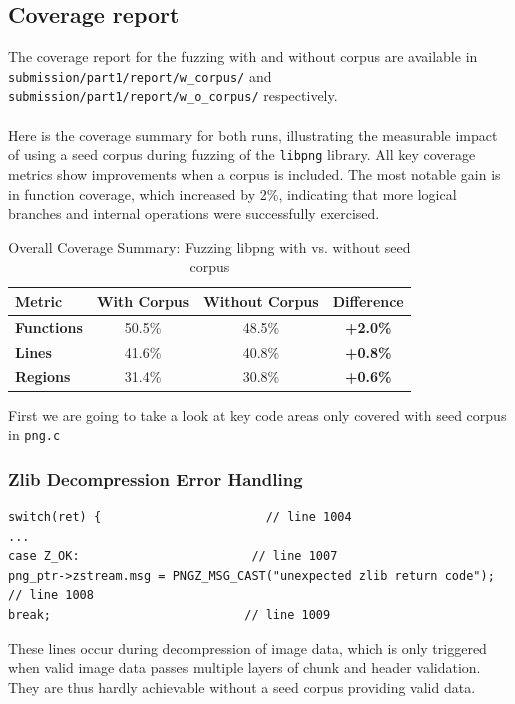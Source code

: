 \documentclass[11pt]{article}
\begin{document}
    \subsection{Coverage report}
    The coverage report for the fuzzing with and without corpus are available in \texttt{submission/part1/report/w\_corpus/} and \texttt{submission/part1/report/w\_o\_corpus/} respectively. \\ \\
    Here is the coverage summary for both runs, illustrating the measurable impact of using a seed corpus during fuzzing of the \texttt{libpng} library. All key coverage metrics show improvements when a corpus is included. The most notable gain is in function coverage, which increased by 2\%, indicating that more logical branches and internal operations were successfully exercised. \newline
    \begin{table}[h!]
        \centering
        \begin{tabular}{|l|c|c|c|}
            \hline
            \textbf{Metric} & \textbf{With Corpus} & \textbf{Without Corpus} & \textbf{Difference} \\
            \hline
            \textbf{Functions} & 50.5\% & 48.5\%  & \textbf{+2.0\%} \\
            \textbf{Lines} & 41.6\%  & 40.8\%  & \textbf{+0.8\%} \\
            \textbf{Regions} & 31.4\%  & 30.8\%  & \textbf{+0.6\%} \\
            \hline
        \end{tabular}
        \caption{Overall Coverage Summary: Fuzzing libpng with vs. without seed corpus}
    \end{table}

    First we are going to take a look at key code areas only covered with seed corpus in \texttt{png.c}

    \subsubsection{Zlib Decompression Error Handling}
    \begin{lstlisting}
switch(ret) {                       // line 1004
...
case Z_OK:                        // line 1007
png_ptr->zstream.msg = PNGZ_MSG_CAST("unexpected zlib return code");  // line 1008
break;                           // line 1009
    \end{lstlisting}

    These lines occur during decompression of image data, which is only triggered when valid image data passes multiple layers of chunk and header validation. They are thus hardly achievable without a seed corpus providing valid data.
\end{document}
